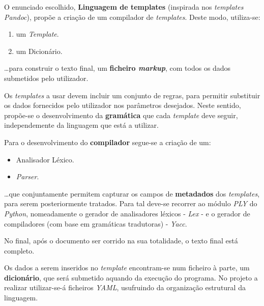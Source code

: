 \documentclass[../relatorio.tex]{subfiles}
\begin{document}
O enunciado escolhido, \textbf{Linguagem de templates} 
(inspirada nos \textit{templates Pandoc}),
propõe a criação de um compilador de \textit{templates}.
Deste modo, utiliza-se:
\begin{enumerate}
    \item um \textit{Template}.
    \item um Dicionário.
\end{enumerate}
\dots para construir o texto final, um \textbf{ficheiro \textit{markup}}, 
com todos os dados submetidos pelo utilizador.  

Os \textit{templates} a usar
devem incluir um conjunto de regras, para permitir 
substituir os dados fornecidos pelo utilizador 
nos parâmetros desejados. 
Neste sentido, propõe-se o desenvolvimento da \textbf{gramática}
que cada \textit{template} deve seguir, 
independemente da linguagem que está a utilizar.

Para o desenvolvimento do \textbf{compilador} segue-se a criação de um:
\begin{itemize}
    \item Analisador Léxico. 
    \item \textit{Parser}.
\end{itemize}
\dots que conjuntamente permitem capturar os campos de 
\textbf{metadados} dos \textit{templates}, para serem 
posteriormente tratados.
Para tal deve-se recorrer ao módulo \textit{PLY} do \textit{Python},
nomeadamente o gerador de analisadores léxicos - \textit{Lex} - e
o gerador de compiladores (com base em gramáticas tradutoras) - \textit{Yacc}.

No final, após o documento ser corrido na sua totalidade,
o texto final está completo.

Os dados a serem inseridos no \textit{template}
encontram-se num ficheiro à parte, um \textbf{dicionário},
que será submetido aquando da execução do programa. 
No projeto a realizar utilizar-se-á ficheiros 
\textit{YAML}, usufruindo da organização 
estrutural da linguagem.
\end{document}
